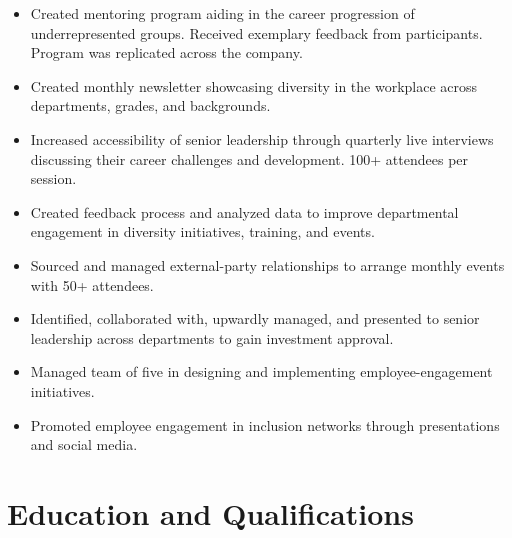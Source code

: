 \documentclass[12pt,letter]{moderncv}
\begin{document}
{\begin{itemize}[label=\large\color{color1}{$\bullet$}]
        reflect society. Increased data collection and its presentation 
        to promote diverse ethnic representation both in new hires, as well as
        across grades and departments.
%
      \item Created mentoring program aiding in the career progression of
        underrepresented groups. Received exemplary feedback from participants.
        Program was replicated across the company.
%
      \item Created monthly newsletter showcasing diversity in the workplace
        across departments, grades, and backgrounds.%
      \item Increased accessibility of senior leadership through quarterly live
        interviews discussing their career challenges and development.
        100+ attendees per session.
      \item Created feedback process and analyzed data to improve departmental
        engagement in diversity initiatives, training, and events.%
      \item Sourced and managed external-party relationships to arrange monthly
        events with 50+ attendees.
      \item Identified, collaborated with, upwardly managed, and presented to
        senior leadership across departments to gain investment approval.%
      \item Managed team of five in designing and implementing
        employee-engagement initiatives.%
      \item Promoted employee engagement in inclusion networks through
        presentations and social media.
\end{itemize}%
%
}%
%
\section{Education and Qualifications}

\end{document}
